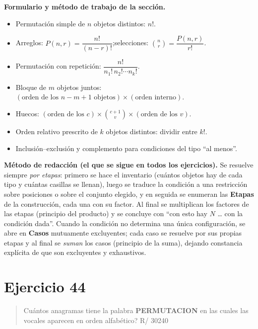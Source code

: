 \documentclass[11pt]{article}
\begin{document}
\begin{tip}
\textbf{Formulario y m\'etodo de trabajo de la secci\'on.}
\begin{itemize}[leftmargin=1.4em]
\item Permutaci\'on simple de $n$ objetos distintos: $n!$.
\item Arreglos: $P(n,r)=\dfrac{n!}{(n-r)!}$;\quad selecciones: $\binom{n}{r}=\dfrac{P(n,r)}{r!}$.
\item Permutaci\'on con repetici\'on: $\dfrac{n!}{n_1!\,n_2!\cdots n_k!}$.
\item Bloque de $m$ objetos juntos: $(\text{orden de los }n-m+1\text{ objetos})\times(\text{orden interno})$.
\item Huecos: $(\text{orden de los }c)\times\binom{c+1}{v}\times(\text{orden de los }v)$.
\item Orden relativo prescrito de $k$ objetos distintos: dividir entre $k!$.
\item Inclusi\'on--exclusi\'on y complemento para condiciones del tipo ``al menos''.
\end{itemize}

\medskip
\textbf{M\'etodo de redacci\'on (el que se sigue en todos los ejercicios).} Se resuelve siempre
\emph{por etapas}: primero se hace el inventario (cu\'antos objetos hay de cada tipo y cu\'antas casillas se
llenan), luego se traduce la condici\'on a una restricci\'on sobre posiciones o sobre el conjunto elegido, y
en seguida se enumeran las \textbf{Etapas} de la construcci\'on, cada una con su factor. Al final se
multiplican los factores de las etapas (principio del producto) y se concluye con ``con esto hay $N$
\dots{} con la condici\'on dada''. Cuando la condici\'on no determina una \'unica configuraci\'on, se abre en
\textbf{Casos} mutuamente excluyentes; cada caso se resuelve por sus propias etapas y al final se
\emph{suman} los casos (principio de la suma), dejando constancia expl\'icita de que son excluyentes y
exhaustivos.
\end{tip}

\section*{Ejercicio 44}

\begin{quote}
Cu\'antos anagramas tiene la palabra \textbf{PERMUTACION} en las cuales las vocales aparecen en orden
alfab\'etico? \hfill R/ 30240
\end{quote}
\end{document}
